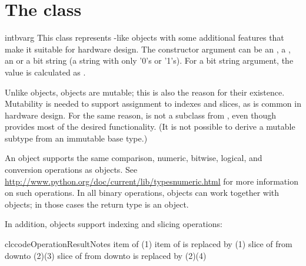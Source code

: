 \section{The  class}

\begin{classdesc}{intbv}{arg}
This class represents -like objects with some additional
features that make it suitable for hardware design. The constructor
argument can be an , a , an  or a
bit string (a string with only '0's or '1's). For a bit string
argument, the value is calculated as . 
\end{classdesc}

Unlike  objects,  objects are mutable; this is
also the reason for their existence. Mutability is needed to support
assignment to indexes and slices, as is common in hardware design. For
the same reason,  is not a subclass from ,
even though  provides most of the desired
functionality. (It is not possible to derive a mutable subtype from
an immutable base type.)

An  object supports the same comparison, numeric,
bitwise, logical, and conversion operations as  objects. See
\url{http://www.python.org/doc/current/lib/typesnumeric.html} for more
information on such operations. In all binary operations,
 objects can work together with  objects; in
those cases the return type is an  object.

In addition,  objects support indexing and slicing
operations:

\begin{tableiii}{clc}{code}{Operation}{Result}{Notes}
	  {item  of }
	  {(1)}
	  {item  of  is replaced by } 
          {(1)}
          {slice of  from  downto } 
          {(2)(3)}
  	  {slice of  from  downto  is replaced
          by } 
          {(2)(4)}
\end{tableiii}

